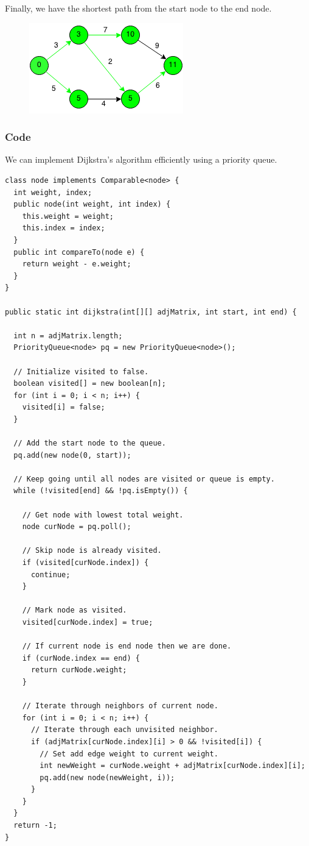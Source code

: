 \documentclass[11pt,oneside]{book}
\makeatletter
\def\maxwidth#1{\ifdim\Gin@nat@width>#1 #1\else\Gin@nat@width\fi}
\makeatother
\begin{document}
Finally, we have the shortest path from the start node to the end node.

\vspace{5px}\begin{figure}[H]\centering
        \includegraphics[width=0.66\maxwidth{\textwidth}]{djikstra6.png}
        \end{figure}

\subsubsection{Code}

We can implement Dijkstra's algorithm efficiently using a priority queue.

\begin{lstlisting}
class node implements Comparable<node> {
  int weight, index;
  public node(int weight, int index) {
    this.weight = weight;
    this.index = index;
  }
  public int compareTo(node e) {
    return weight - e.weight;
  }
}

public static int dijkstra(int[][] adjMatrix, int start, int end) {

  int n = adjMatrix.length;
  PriorityQueue<node> pq = new PriorityQueue<node>();

  // Initialize visited to false.
  boolean visited[] = new boolean[n];
  for (int i = 0; i < n; i++) {
    visited[i] = false;
  }

  // Add the start node to the queue.
  pq.add(new node(0, start));

  // Keep going until all nodes are visited or queue is empty.
  while (!visited[end] && !pq.isEmpty()) {

    // Get node with lowest total weight.
    node curNode = pq.poll();

    // Skip node is already visited.
    if (visited[curNode.index]) {
      continue;
    }

    // Mark node as visited.
    visited[curNode.index] = true;

    // If current node is end node then we are done.
    if (curNode.index == end) {
      return curNode.weight;
    }

    // Iterate through neighbors of current node.
    for (int i = 0; i < n; i++) {
      // Iterate through each unvisited neighbor.
      if (adjMatrix[curNode.index][i] > 0 && !visited[i]) {
        // Set add edge weight to current weight.
        int newWeight = curNode.weight + adjMatrix[curNode.index][i];
        pq.add(new node(newWeight, i));
      }
    }
  }
  return -1;
}
\end{lstlisting}
\end{document}
